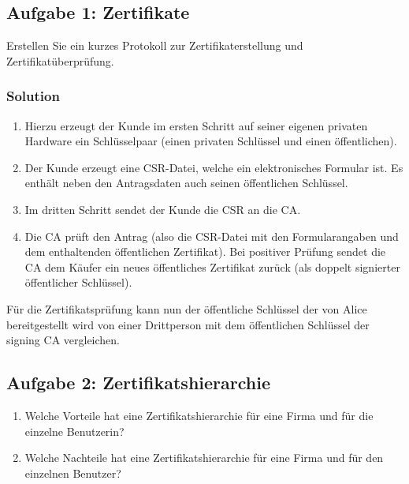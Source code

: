 \documentclass[11pt]{article}
\providecommand{\tightlist}{%
      \setlength{\itemsep}{0pt}\setlength{\parskip}{0pt}}
\begin{document}
    \hypertarget{aufgabe-1-zertifikate}{%
\subsection{Aufgabe 1: Zertifikate}\label{aufgabe-1-zertifikate}}

Erstellen Sie ein kurzes Protokoll zur Zertifikaterstellung und
Zertifikatüberprüfung.

\hypertarget{solution}{%
\subsubsection{Solution}\label{solution}}

\begin{enumerate}
\def\labelenumi{\arabic{enumi}.}
\tightlist
\item
  Hierzu erzeugt der Kunde im ersten Schritt auf seiner eigenen privaten
  Hardware ein Schlüsselpaar (einen privaten Schlüssel und einen
  öffentlichen).
\item
  Der Kunde erzeugt eine CSR-Datei, welche ein elektronisches Formular
  ist. Es enthält neben den Antragsdaten auch seinen öffentlichen
  Schlüssel.
\item
  Im dritten Schritt sendet der Kunde die CSR an die CA.
\item
  Die CA prüft den Antrag (also die CSR-Datei mit den Formularangaben
  und dem enthaltenden öffentlichen Zertifikat). Bei positiver Prüfung
  sendet die CA dem Käufer ein neues öffentliches Zertifikat zurück (als
  doppelt signierter öffentlicher Schlüssel).
\end{enumerate}

Für die Zertifikatsprüfung kann nun der öffentliche Schlüssel der von
Alice bereitgestellt wird von einer Drittperson mit dem öffentlichen
Schlüssel der signing CA vergleichen.

    \hypertarget{aufgabe-2-zertifikatshierarchie}{%
\subsection{Aufgabe 2:
Zertifikatshierarchie}\label{aufgabe-2-zertifikatshierarchie}}

\begin{enumerate}
\def\labelenumi{\arabic{enumi}.}
\tightlist
\item
  Welche Vorteile hat eine Zertifikatshierarchie für eine Firma und für
  die einzelne Benutzerin?
\item
  Welche Nachteile hat eine Zertifikatshierarchie für eine Firma und für
  den einzelnen Benutzer?
\end{enumerate}
\end{document}
